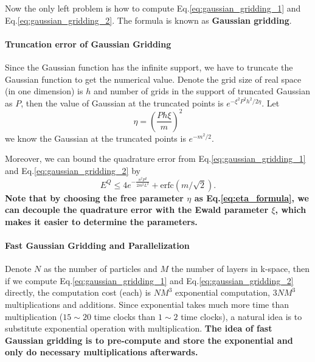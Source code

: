 \documentclass{article}[12pt]
\begin{document}
Now the only left problem is how to compute Eq.\eqref{eq:gaussian_gridding_1} and Eq.\eqref{eq:gaussian_gridding_2}. The formula is known as \textbf{Gaussian gridding}.

\paragraph{Truncation error of Gaussian Gridding}
Since the Gaussian function has the infinite support, we have to truncate the Gaussian function to get the numerical value. Denote the grid size of real space (in one dimension) is $h$ and number of grids in the support of truncated Gaussian as $P$, then the value of Gaussian at the truncated points is $e^{- \xi^2 P^2 h^2 / 2 \eta}$. Let 
\begin{equation}
\eta =  \left(\frac{P h \xi}{m} \right)^2 \label{eq:eta_formula}
\end{equation}
we know the Gaussian at the truncated points is $e^{-m^2/2}$.

Moreover, we can bound the quadrature error from  Eq.\eqref{eq:gaussian_gridding_1} and Eq.\eqref{eq:gaussian_gridding_2} by
\begin{equation}
E^Q \le  4 e^{- \frac{\pi^2 P^2}{2 m^2 L^2}} + \text{erfc} (m / \sqrt{2}).
\end{equation}
\textbf{Note that by choosing the free parameter $\eta$ as Eq.\eqref{eq:eta_formula}, we can decouple the quadrature error with the Ewald parameter $\xi$, which makes it easier to determine the parameters.}

\paragraph{Fast Gaussian Gridding and Parallelization} Denote $N$ as the number of particles and $M$ the number of layers in k-space, then if we compute Eq.\eqref{eq:gaussian_gridding_1} and Eq.\eqref{eq:gaussian_gridding_2} directly, the computation cost (each) is $NM^3$ exponential computation, $3NM^3$ multiplications and additions. Since exponential takes much more time than multiplication ($15 \sim 20$ time clocks than $1 \sim 2$ time clocks), a natural idea is to substitute exponential operation with multiplication. \textbf{The idea of fast Gaussian gridding is to pre-compute and store the exponential and only do necessary multiplications afterwards.}
\end{document}
